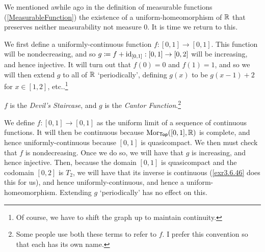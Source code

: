 We mentioned awhile ago in the definition of measurable functions (\cref{MeasurableFunction}) the existence of a uniform-homeomorphism of $\mathbb{R}$ that preserves neither measurability not measure $0$.  It is time we return to this.
\begin{exm}\label{CantorFunction}
We first define a uniformly-continuous function $f:[0,1]\rightarrow [0,1]$.  This function will be nondecreasing, and so $g\coloneqq f+\operatorname{id} _{[0,1]}:[0,1]\rightarrow [0,2]$ will be increasing, and hence injective.  It will turn out that $f(0)=0$ and $f(1)=1$, and so we will then extend $g$ to all of $\mathbb{R}$ `periodically', defining $g(x)$ to be $g(x-1)+2$ for $x\in [1,2]$, etc..\footnote{Of course, we have to shift the graph up to maintain continuity.} 
\begin{rmk}
$f$ is the \emph{Devil's Staircase}, and $g$ is the \emph{Cantor Function}.\footnote{Some people use both these terms to refer to $f$.  I prefer this convention so that each has its own name.}
\end{rmk}

We define $f:[0,1]\rightarrow [0,1]$ as the uniform limit of a sequence of continuous functions.  It will then be continuous because $\operatorname{Mor} _{\mathsf{Top}}([0,1],\mathbb{R} )$ is complete, and hence uniformly-continuous because $[0,1]$ is quasicompact.  We then must check that $f$ is nondecreasing.  Once we do so, we will have that $g$ is increasing, and hence injective.  Then, because the domain $[0,1]$ is quasicompact and the codomain $[0,2]$ is $T_2$, we will have that its inverse is continuous (\cref{exr3.6.46} does this for us), and hence uniformly-continuous, and hence a uniform-homeomorphism.  Extending $g$ `periodically' has no effect on this.


\end{exm}
